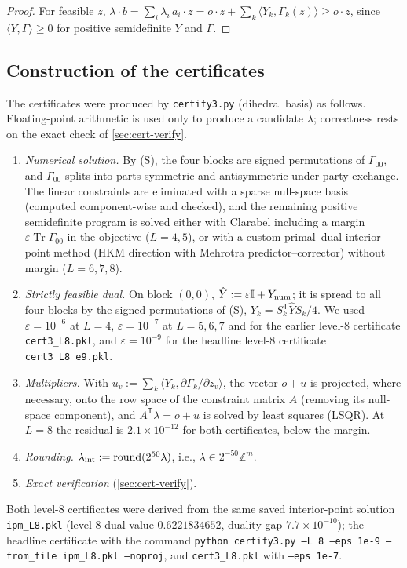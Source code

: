 \documentclass[aps,pra,onecolumn,notitlepage,superscriptaddress,longbibliography,nofootinbib,11pt]{revtex4-2}
\theoremstyle{remark}
\newcommand{\Tr}{\operatorname{Tr}}
\newcommand{\one}{\mathbb{I}}
\newcommand{\tp}{\mathsf{T}}
\newcommand{\ZZ}{\mathbb{Z}}
\newcommand{\file}[1]{\texttt{#1}}
\begin{document}
\begin{proof}
For feasible $z$, $\lambda\cdot b=\sum_i\lambda_i\,a_i\cdot z=o\cdot z+\sum_k\langle Y_k,\Gamma_k(z)\rangle\ge o\cdot z$, since $\langle Y,\Gamma\rangle\ge0$ for positive semidefinite $Y$ and $\Gamma$.
\end{proof}

\subsection{Construction of the certificates}\label{sec:cert-construct}

The certificates were produced by \file{certify3.py} (dihedral basis) as follows. Floating-point arithmetic is used only to produce a candidate $\lambda$; correctness rests on the exact check of \ref{sec:cert-verify}.
\begin{enumerate}
\item \emph{Numerical solution.} By (S), the four blocks are signed permutations of $\Gamma_{00}$, and $\Gamma_{00}$ splits into parts symmetric and antisymmetric under party exchange. The linear constraints are eliminated with a sparse null-space basis (computed component-wise and checked), and the remaining positive semidefinite program is solved either with Clarabel including a margin $\varepsilon\Tr\Gamma_{00}$ in the objective ($L=4,5$), or with a custom primal--dual interior-point method (HKM direction with Mehrotra predictor--corrector) without margin ($L=6,7,8$).
\item \emph{Strictly feasible dual.} On block $(0,0)$, $\hat Y:=\varepsilon\one+Y_{\rm num}$; it is spread to all four blocks by the signed permutations of (S), $Y_k=S_k^\tp\hat YS_k/4$. We used $\varepsilon=10^{-6}$ at $L=4$, $\varepsilon=10^{-7}$ at $L=5,6,7$ and for the earlier level-8 certificate \file{cert3\_L8.pkl}, and $\varepsilon=10^{-9}$ for the headline level-8 certificate \file{cert3\_L8\_e9.pkl}.
\item \emph{Multipliers.} With $u_v:=\sum_k\langle Y_k,\partial\Gamma_k/\partial z_v\rangle$, the vector $o+u$ is projected, where necessary, onto the row space of the constraint matrix $A$ (removing its null-space component), and $A^\tp\lambda=o+u$ is solved by least squares (LSQR). At $L=8$ the residual is $2.1\times10^{-12}$ for both certificates, below the margin.
\item \emph{Rounding.} $\lambda_{\rm int}:={\rm round}(2^{50}\lambda)$, i.e., $\lambda\in2^{-50}\ZZ^m$.
\item \emph{Exact verification} (\ref{sec:cert-verify}).
\end{enumerate}
Both level-8 certificates were derived from the same saved interior-point solution \file{ipm\_L8.pkl} (level-8 dual value $0.6221834652$, duality gap $7.7\times10^{-10}$); the headline certificate with the command \file{python certify3.py --L 8 --eps 1e-9 --from\_file ipm\_L8.pkl --noproj}, and \file{cert3\_L8.pkl} with \file{--eps 1e-7}.
\end{document}
